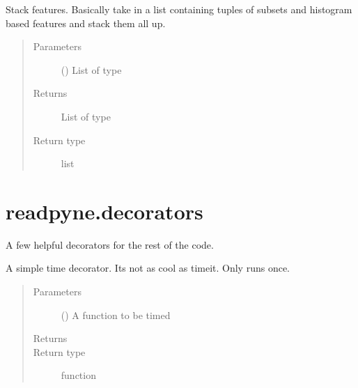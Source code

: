 \documentclass[letterpaper,10pt,english]{sphinxmanual}
\begin{document}
\begin{fulllineitems}
\label{\detokenize{api:readpyne.core.stack}}
Stack features. Basically take in a list containing
tuples of subsets and histogram based features and
stack them all up.
\begin{quote}\begin{description}
\item[{Parameters}] \leavevmode
{} () \textendash{} List of type \sphinxcode{\sphinxupquote{{[}({[}subsets{]}, {[}features{]}), ...{]}}}

\item[{Returns}] \leavevmode
List of type 

\item[{Return type}] \leavevmode
list

\end{description}\end{quote}

\end{fulllineitems}

\label{\detokenize{api:module-readpyne.decorators}}

\section{readpyne.decorators}
\label{\detokenize{api:readpyne-decorators}}
A few helpful decorators for the rest of the code.

\begin{fulllineitems}
\label{\detokenize{api:readpyne.decorators.timeit}}
A simple time decorator. Its not as cool as timeit.
Only runs once.
\begin{quote}\begin{description}
\item[{Parameters}] \leavevmode
{} () \textendash{} A function to be timed

\item[{Returns}] \leavevmode


\item[{Return type}] \leavevmode
function

\end{description}\end{quote}

\end{fulllineitems}
\end{document}
